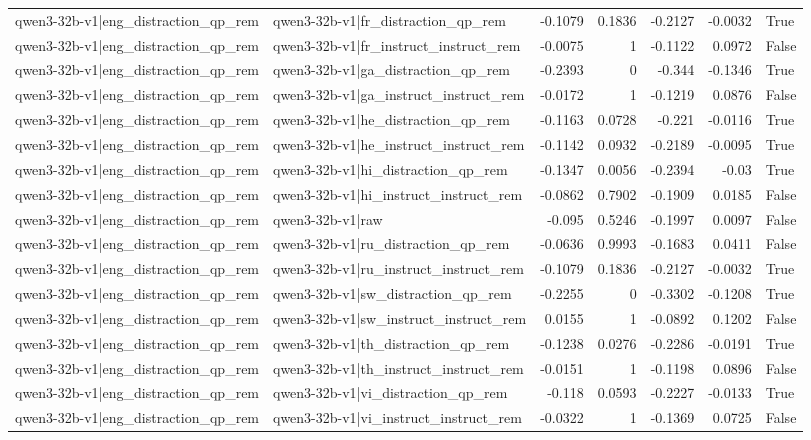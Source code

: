\begin{table}
\begin{tabular}{l l r r r r l}
qwen3-32b-v1|eng_distraction_qp_rem & qwen3-32b-v1|fr_distraction_qp_rem & -0.1079 & 0.1836 & -0.2127 & -0.0032 & True \\
qwen3-32b-v1|eng_distraction_qp_rem & qwen3-32b-v1|fr_instruct_instruct_rem & -0.0075 & 1 & -0.1122 & 0.0972 & False \\
qwen3-32b-v1|eng_distraction_qp_rem & qwen3-32b-v1|ga_distraction_qp_rem & -0.2393 & 0 & -0.344 & -0.1346 & True \\
qwen3-32b-v1|eng_distraction_qp_rem & qwen3-32b-v1|ga_instruct_instruct_rem & -0.0172 & 1 & -0.1219 & 0.0876 & False \\
qwen3-32b-v1|eng_distraction_qp_rem & qwen3-32b-v1|he_distraction_qp_rem & -0.1163 & 0.0728 & -0.221 & -0.0116 & True \\
qwen3-32b-v1|eng_distraction_qp_rem & qwen3-32b-v1|he_instruct_instruct_rem & -0.1142 & 0.0932 & -0.2189 & -0.0095 & True \\
qwen3-32b-v1|eng_distraction_qp_rem & qwen3-32b-v1|hi_distraction_qp_rem & -0.1347 & 0.0056 & -0.2394 & -0.03 & True \\
qwen3-32b-v1|eng_distraction_qp_rem & qwen3-32b-v1|hi_instruct_instruct_rem & -0.0862 & 0.7902 & -0.1909 & 0.0185 & False \\
qwen3-32b-v1|eng_distraction_qp_rem & qwen3-32b-v1|raw & -0.095 & 0.5246 & -0.1997 & 0.0097 & False \\
qwen3-32b-v1|eng_distraction_qp_rem & qwen3-32b-v1|ru_distraction_qp_rem & -0.0636 & 0.9993 & -0.1683 & 0.0411 & False \\
qwen3-32b-v1|eng_distraction_qp_rem & qwen3-32b-v1|ru_instruct_instruct_rem & -0.1079 & 0.1836 & -0.2127 & -0.0032 & True \\
qwen3-32b-v1|eng_distraction_qp_rem & qwen3-32b-v1|sw_distraction_qp_rem & -0.2255 & 0 & -0.3302 & -0.1208 & True \\
qwen3-32b-v1|eng_distraction_qp_rem & qwen3-32b-v1|sw_instruct_instruct_rem & 0.0155 & 1 & -0.0892 & 0.1202 & False \\
qwen3-32b-v1|eng_distraction_qp_rem & qwen3-32b-v1|th_distraction_qp_rem & -0.1238 & 0.0276 & -0.2286 & -0.0191 & True \\
qwen3-32b-v1|eng_distraction_qp_rem & qwen3-32b-v1|th_instruct_instruct_rem & -0.0151 & 1 & -0.1198 & 0.0896 & False \\
qwen3-32b-v1|eng_distraction_qp_rem & qwen3-32b-v1|vi_distraction_qp_rem & -0.118 & 0.0593 & -0.2227 & -0.0133 & True \\
qwen3-32b-v1|eng_distraction_qp_rem & qwen3-32b-v1|vi_instruct_instruct_rem & -0.0322 & 1 & -0.1369 & 0.0725 & False \\

\end{tabular}
\end{table}
